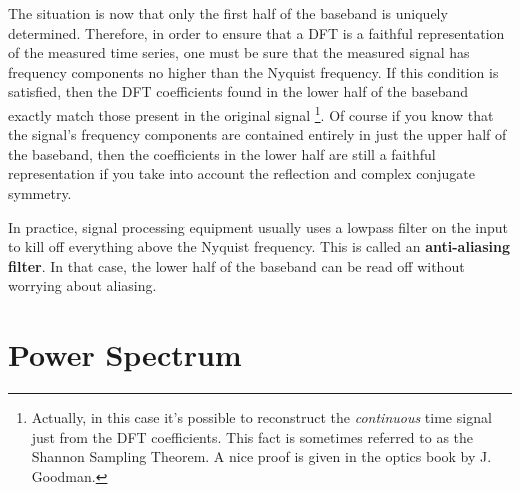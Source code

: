 \documentclass[twocolumn]{article}
\begin{document}
The situation is now that only the first half of the baseband is uniquely determined. Therefore, in order to ensure that a DFT is a faithful representation of the measured time series, one must be sure that the measured signal has frequency components no higher than the Nyquist frequency. If this condition is satisfied, then the DFT coefficients found in the lower half of the baseband exactly match those present in the original signal \footnote{Actually, in this case it's possible to reconstruct the \emph{continuous} time signal just from the DFT coefficients. This fact is sometimes referred to as the Shannon Sampling Theorem. A nice proof is given in the optics book by J. Goodman.}. Of course if you know that the signal's frequency components are contained entirely in just the upper half of the baseband, then the coefficients in the lower half are still a faithful representation if you take into account the reflection and complex conjugate symmetry.

In practice, signal processing equipment usually uses a lowpass filter on the input to kill off everything above the Nyquist frequency. This is called an \textbf{anti-aliasing filter}. In that case, the lower half of the baseband can be read off without worrying about aliasing.


\section{Power Spectrum}
\end{document}
